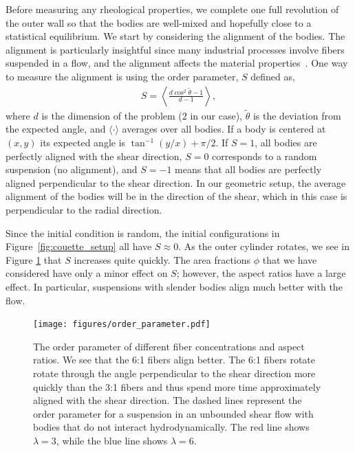 \documentclass[preprint, 10pt]{elsarticle}
\begin{document}
Before measuring any rheological properties, we complete one full
revolution of the outer wall so that the bodies are well-mixed and
hopefully close to a statistical equilibrium.  We start by considering
the alignment of the bodies. The alignment is particularly insightful
since many industrial processes involve fibers suspended in a flow, and
the alignment affects the material properties~\cite{larsoncf}.  One way
to measure the alignment is using the order parameter, $S$ defined as,
\begin{align*}
  S = \left\langle \frac{d \cos^2\tilde{\theta} - 1}{d - 1} \right\rangle,
\end{align*}
where $d$ is the dimension of the problem ($2$ in our case),
$\tilde{\theta}$ is the deviation from the expected angle, and $\langle
\cdot\rangle$ averages over all bodies.  If a body is
centered at $(x,y)$ its expected angle is $\tan^{-1}(y/x) + \pi/2$. If
$S=1$, all bodies are perfectly aligned with the shear direction,
$S=0$ corresponds to a random suspension (no alignment), and $S=-1$
means that all bodies are perfectly aligned perpendicular to the
shear direction.  In our geometric setup, the average alignment of the
bodies will be in the direction of the shear, which in this case is
perpendicular to the radial direction.

Since the initial condition is random, the initial configurations in
Figure~\ref{fig:couette_setup} all have $S\approx 0$. As the outer
cylinder rotates, we see in Figure \ref{fig:angles} that $S$ increases
quite quickly. The area fractions $\phi$ that we have considered have
only a minor effect on $S$; however, the aspect ratios have a large
effect.  In particular, suspensions with slender bodies align much
better with the flow. 



\begin{figure}[!h]
\begin{center}
\texttt{[image: figures/order\_parameter.pdf]}\\
\end{center}
\caption{\label{fig:angles} The order parameter of different fiber
concentrations and aspect ratios. We see that the 6:1 fibers align
better. The 6:1 fibers rotate rotate through the angle perpendicular to
the shear direction more quickly than the 3:1 fibers and thus spend more
time approximately aligned with the shear direction. The dashed lines
represent the order parameter for a suspension in an unbounded shear
flow with bodies that do not interact hydrodynamically. The red line
shows $\lambda=3$, while the blue line shows $\lambda=6$. }
\end{figure} 
\end{document}
